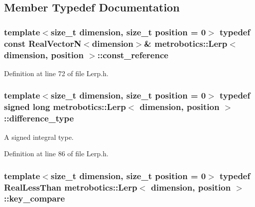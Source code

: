 \subsection{\-Member \-Typedef \-Documentation}
\hypertarget{classmetrobotics_1_1Lerp_a815b15d3fb2de9989d053e9d17fac48f}{
\subsubsection[{const\-\_\-reference}]{\setlength{\rightskip}{0pt plus 5cm}template$<$size\-\_\-t dimension, size\-\_\-t position = 0$>$ typedef const {\bf \-Real\-Vector\-N}$<$dimension$>$\& {\bf metrobotics\-::\-Lerp}$<$ dimension, position $>$\-::{\bf const\-\_\-reference}}}\label{classmetrobotics_1_1Lerp_a815b15d3fb2de9989d053e9d17fac48f}


\-Definition at line 72 of file \-Lerp.\-h.

\hypertarget{classmetrobotics_1_1Lerp_ab33debb53d79b253af93112e65630909}{
\subsubsection[{difference\-\_\-type}]{\setlength{\rightskip}{0pt plus 5cm}template$<$size\-\_\-t dimension, size\-\_\-t position = 0$>$ typedef signed long {\bf metrobotics\-::\-Lerp}$<$ dimension, position $>$\-::{\bf difference\-\_\-type}}}\label{classmetrobotics_1_1Lerp_ab33debb53d79b253af93112e65630909}


\-A signed integral type. 



\-Definition at line 86 of file \-Lerp.\-h.

\hypertarget{classmetrobotics_1_1Lerp_af2461f16ba03ed44a4896aba2cea4d29}{
\subsubsection[{key\-\_\-compare}]{\setlength{\rightskip}{0pt plus 5cm}template$<$size\-\_\-t dimension, size\-\_\-t position = 0$>$ typedef {\bf \-Real\-Less\-Than} {\bf metrobotics\-::\-Lerp}$<$ dimension, position $>$\-::{\bf key\-\_\-compare}}}\label{classmetrobotics_1_1Lerp_af2461f16ba03ed44a4896aba2cea4d29}


